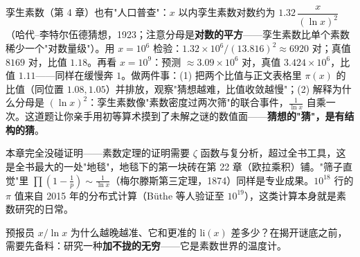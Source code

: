 \begin{shaonao}
孪生素数（第 4 章）也有"人口普查"：$x$ 以内孪生素数对数约为 $1.32\,\dfrac{x}{(\ln x)^2}$（哈代--李特尔伍德猜想，1923；注意分母是\textbf{对数的平方}——孪生素数比单个素数稀少一个"对数量级"）。用 $x = 10^6$ 检验：$1.32\times10^6/(13.816)^2 \approx 6920$ 对；真值 $8169$ 对，比值 $1.18$。再看 $x = 10^9$：预测 $\approx 3.09\times10^6$ 对，真值 $3.424\times10^6$，比值 $1.11$——同样在缓慢奔 $1$。做两件事：(1) 把两个比值与正文表格里 $\pi(x)$ 的比值（同位置 $1.08, 1.05$）并排放，观察"猜想越难，比值收敛越慢"；(2) 解释为什么分母是 $(\ln x)^2$：孪生素数像"素数密度过两次筛"的联合事件，$\tfrac1{\ln x}$ 自乘一次。这道题让你亲手用初等算术摸到了未解之谜的数值面——\textbf{猜想的"猜"，是有结构的猜}。
\end{shaonao}

\begin{chengshi}
本章完全没碰证明——素数定理的证明需要 $\zeta$ 函数与复分析，超过全书工具，这是全书最大的一处"地毯"，地毯下的第一块砖在第 22 章（欧拉乘积）铺。"筛子直觉"里 $\prod(1-\tfrac1p) \sim \tfrac1{\ln x}$（梅尔滕斯第三定理，1874）同样是专业成果。$10^{18}$ 行的 $\pi$ 值来自 2015 年的分布式计算（Büthe 等人验证至 $10^{19}$），这类计算本身就是素数研究的日常。
\end{chengshi}

预报员 $x/\ln x$ 为什么越晚越准、它和更准的 $\mathrm{li}(x)$ 差多少？在揭开谜底之前，需要先备料：研究一种\textbf{加不拢的无穷}——它是素数世界的温度计。

